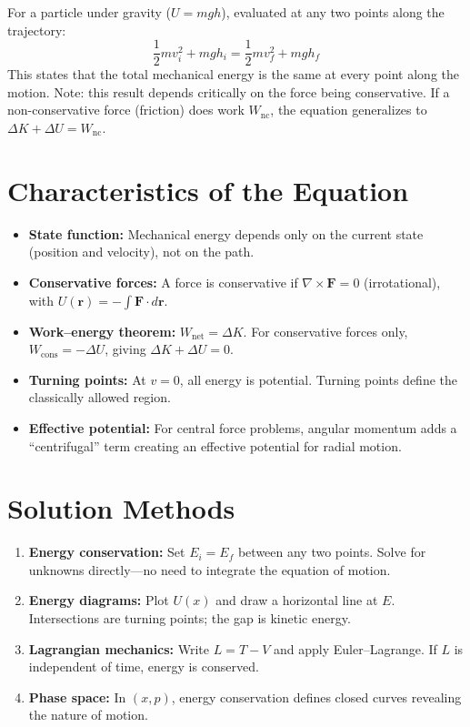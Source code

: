 For a particle under gravity ($U = mgh$), evaluated at any two points along the trajectory:
\begin{equation}
\boxed{\frac{1}{2}mv_i^2 + mgh_i = \frac{1}{2}mv_f^2 + mgh_f}
\end{equation}
This states that the total mechanical energy is the same at every point along the motion. Note: this result depends critically on the force being conservative. If a non-conservative force (friction) does work $W_{\text{nc}}$, the equation generalizes to $\Delta K + \Delta U = W_{\text{nc}}$.

\section*{Characteristics of the Equation}

\begin{itemize}
\item \textbf{State function:} Mechanical energy depends only on the current state (position and velocity), not on the path.
\item \textbf{Conservative forces:} A force is conservative if $\nabla \times \mathbf{F} = 0$ (irrotational), with $U(\mathbf{r}) = -\int \mathbf{F} \cdot d\mathbf{r}$.
\item \textbf{Work--energy theorem:} $W_{\text{net}} = \Delta K$. For conservative forces only, $W_{\text{cons}} = -\Delta U$, giving $\Delta K + \Delta U = 0$.
\item \textbf{Turning points:} At $v = 0$, all energy is potential. Turning points define the classically allowed region.
\item \textbf{Effective potential:} For central force problems, angular momentum adds a ``centrifugal'' term creating an effective potential for radial motion.
\end{itemize}
\section*{Solution Methods}

\begin{enumerate}
\item \textbf{Energy conservation:} Set $E_i = E_f$ between any two points. Solve for unknowns directly---no need to integrate the equation of motion.
\item \textbf{Energy diagrams:} Plot $U(x)$ and draw a horizontal line at $E$. Intersections are turning points; the gap is kinetic energy.
\item \textbf{Lagrangian mechanics:} Write $L = T - V$ and apply Euler--Lagrange. If $L$ is independent of time, energy is conserved.
\item \textbf{Phase space:} In $(x, p)$, energy conservation defines closed curves revealing the nature of motion.
\end{enumerate}

